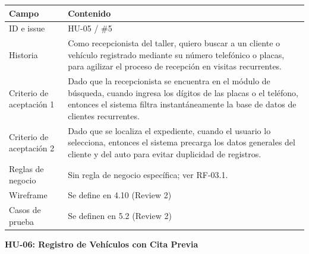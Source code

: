 {\def\LTcaptype{none} %
\begin{longtable}[]{@{}
  >{\raggedright\arraybackslash}p{}
  >{\raggedright\arraybackslash}p{}@{}}
\toprule\noalign{}
\begin{minipage}[b]{\linewidth}\raggedright
\textbf{Campo}
\end{minipage} & \begin{minipage}[b]{\linewidth}\raggedright
\textbf{Contenido}
\end{minipage} \\
\midrule\noalign{}
\endhead
\bottomrule\noalign{}
\endlastfoot
ID e issue & HU-05 / \#5 \\
Historia & Como recepcionista del taller, quiero buscar a un cliente o
vehículo registrado mediante su número telefónico o placas, para
agilizar el proceso de recepción en visitas recurrentes. \\
Criterio de aceptación 1 & Dado que la recepcionista se encuentra en el
módulo de búsqueda, cuando ingresa los dígitos de las placas o el
teléfono, entonces el sistema filtra instantáneamente la base de datos
de clientes recurrentes. \\
Criterio de aceptación 2 & Dado que se localiza el expediente, cuando el
usuario lo selecciona, entonces el sistema precarga los datos generales
del cliente y del auto para evitar duplicidad de registros. \\
Reglas de negocio & Sin regla de negocio específica; ver RF-03.1. \\
Wireframe & Se define en 4.10 (Review 2) \\
Casos de prueba & Se definen en 5.2 (Review 2) \\
\end{longtable}
}

\textbf{HU-06: Registro de Vehículos con Cita Previa}

